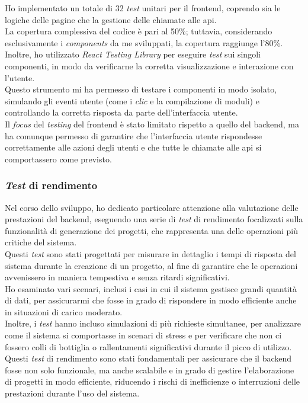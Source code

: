 \noindent Ho implementato un totale di 32 \textit{test} unitari per il \gls{frontend}, coprendo sia le logiche delle pagine che la gestione delle chiamate alle \gls{api}.\\
La copertura complessiva del codice è pari al 50\%; tuttavia, considerando esclusivamente i \textit{components} da me sviluppati, la copertura raggiunge l'80\%.\\
Inoltre, ho utilizzato \textit{React Testing Library} per eseguire \textit{test} sui singoli componenti, in modo da verificarne la corretta visualizzazione e interazione con l'utente. \\
Questo strumento mi ha permesso di testare i componenti in modo isolato, simulando gli eventi utente (come i \textit{clic} e la compilazione di moduli) e controllando la corretta risposta da parte dell'interfaccia utente.\\

\noindent Il \textit{focus} del \textit{testing} del \gls{frontend} è stato limitato rispetto a quello del \gls{backend}, ma ha comunque permesso di garantire che l'interfaccia utente rispondesse correttamente alle azioni degli utenti e che tutte le chiamate alle \gls{api} si comportassero come previsto.


\subsubsection{\textit{Test} di rendimento}  

Nel corso dello sviluppo, ho dedicato particolare attenzione alla valutazione delle prestazioni del \gls{backend}, eseguendo una serie di \textit{test} di rendimento focalizzati sulla funzionalità di generazione dei progetti, che rappresenta una delle operazioni più critiche del sistema. \\

\noindent Questi \textit{test} sono stati progettati per misurare in dettaglio i tempi di risposta del sistema durante la creazione di un progetto, al fine di garantire che le operazioni avvenissero in maniera tempestiva e senza ritardi significativi. \\
Ho esaminato vari scenari, inclusi i casi in cui il sistema gestisce grandi quantità di dati, per assicurarmi che fosse in grado di rispondere in modo efficiente anche in situazioni di carico moderato.\\

\noindent Inoltre, i \textit{test} hanno incluso simulazioni di più richieste simultanee, per analizzare come il sistema si comportasse in scenari di stress e per verificare che non ci fossero colli di bottiglia o rallentamenti significativi durante il picco di utilizzo. \\

\noindent Questi \textit{test} di rendimento sono stati fondamentali per assicurare che il \gls{backend} fosse non solo funzionale, ma anche scalabile e in grado di gestire l'elaborazione di progetti in modo efficiente, riducendo i rischi di inefficienze o interruzioni delle prestazioni durante l'uso del sistema.
